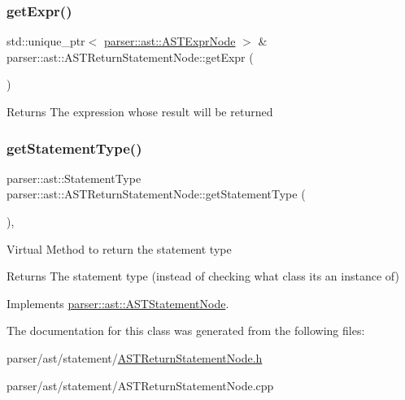 \subsubsection{\texorpdfstring{get\+Expr()}{getExpr()}}
{\footnotesize\ttfamily std\+::unique\+\_\+ptr$<$ \hyperlink{classparser_1_1ast_1_1ASTExprNode}{parser\+::ast\+::\+A\+S\+T\+Expr\+Node} $>$ \& parser\+::ast\+::\+A\+S\+T\+Return\+Statement\+Node\+::get\+Expr (\begin{DoxyParamCaption}{ }\end{DoxyParamCaption})}

\begin{DoxyReturn}{Returns}
The expression whose result will be returned 
\end{DoxyReturn}
\mbox{\label{classparser_1_1ast_1_1ASTReturnStatementNode_a8e1fdae4c10f1e3349b244914e5117be}} 
\subsubsection{\texorpdfstring{get\+Statement\+Type()}{getStatementType()}}
{\footnotesize\ttfamily parser\+::ast\+::\+Statement\+Type parser\+::ast\+::\+A\+S\+T\+Return\+Statement\+Node\+::get\+Statement\+Type (\begin{DoxyParamCaption}{ }\end{DoxyParamCaption})\hspace{0.3cm}{\ttfamily [override]}, {\ttfamily [virtual]}}

Virtual Method to return the statement type \begin{DoxyReturn}{Returns}
The statement type (instead of checking what class it\textquotesingle{}s an instance of) 
\end{DoxyReturn}


Implements \hyperlink{classparser_1_1ast_1_1ASTStatementNode_ac381d35d12f774a1bab0e209c5bfec1f}{parser\+::ast\+::\+A\+S\+T\+Statement\+Node}.



The documentation for this class was generated from the following files\+:\begin{DoxyCompactItemize}
\item 
parser/ast/statement/\hyperlink{ASTReturnStatementNode_8h}{A\+S\+T\+Return\+Statement\+Node.\+h}\item 
parser/ast/statement/A\+S\+T\+Return\+Statement\+Node.\+cpp\end{DoxyCompactItemize}
